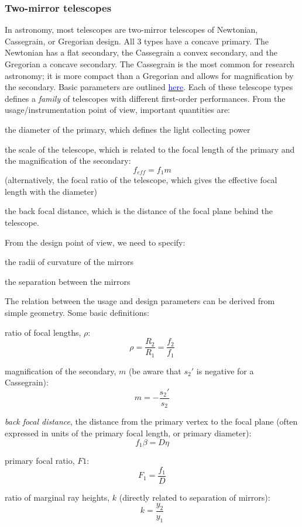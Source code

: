 \documentclass[12pt]{article}
\begin{document}
\subsubsection*{Two-mirror telescopes}
In astronomy, most telescopes are two-mirror telescopes of Newtonian,
Cassegrain, or Gregorian design. All 3 types have a concave primary.
The Newtonian has a flat secondary, the Cassegrain a convex secondary,
and the Gregorian a concave secondary. The Cassegrain is the most
common for research astronomy; it is more compact than a Gregorian and
allows for magnification by the secondary. Basic parameters are
outlined
\href{http://astronomy.nmsu.edu/holtz/a535/html/diagrams/a535/cassegra.htm}
{\textcolor{blue}{here}}.
Each of these telescope types defines a \emph{family} of
telescopes with different first-order performances. From the
usage/instrumentation point of view, important quantities are:
\begin{itemize*}
    \item the diameter of the primary, which defines the light
        collecting power
    \item the scale of the telescope, which is related to the focal
        length of the primary and the magnification of the secondary:
        $$ f_{eff} = f_1m  $$
        (alternatively, the focal ratio of the telescope, which gives
        the effective focal length with the diameter)
    \item the back focal distance, which is the distance of the focal
        plane behind the telescope.
\end{itemize*}
From the design point of view, we need to specify:
\begin{itemize*}
    \item the radii of curvature of the mirrors
    \item the separation between the mirrors
\end{itemize*}
The relation between the usage and design parameters can be derived
from simple geometry. Some basic definitions:
\begin{itemize*}
    \item ratio of focal lengths, $\rho$:
        $$ \rho = \frac{R_2}{R_1} = \frac{f_2}{f_1}  $$
    \item magnification of the secondary, $m$ (be aware that $s_2'$ is
        negative for a Cassegrain):
        $$ m = -\frac{s_2'}{s_2} $$
    \item \emph{back focal distance},
        the distance from the primary vertex to
        the focal plane (often expressed in units of the primary focal
        length, or primary diameter):
        $$ f_{1}\beta = D\eta  $$
    \item primary focal ratio, $F1$:
        $$ F_{1} = \frac{f_{1}}{D} $$
    \item ratio of marginal ray heights, $k$ (directly related to
        separation of mirrors):
        $$ k = \frac{y_{2}}{y_{1}}  $$
\end{itemize*}
\end{document}
